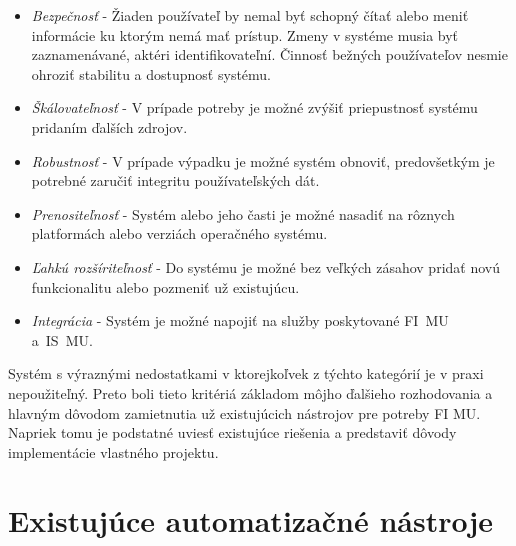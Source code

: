 \documentclass[
  digital, %
  twoside, %
  table,   %
  lof,     %
  lot,     %
]{fithesis3}
\begin{document}
\begin{itemize}
    \item \textit{Bezpečnosť} - Žiaden používateľ by nemal byť schopný čítať alebo meniť informácie ku ktorým nemá mať prístup. Zmeny v systéme musia byť zaznamenávané, aktéri identifikovateľní. Činnosť bežných používateľov nesmie ohroziť stabilitu a dostupnosť systému.
    \item \textit{Škálovateľnosť} - V prípade potreby je možné zvýšiť priepustnosť systému pridaním ďalších zdrojov.
    \item \textit{Robustnosť} - V prípade výpadku je možné systém obnoviť, predovšetkým je potrebné zaručiť integritu používateľských dát.  
    \item \textit{Prenositeľnosť} - Systém alebo jeho časti je možné nasadiť na rôznych platformách alebo verziách operačného systému.
    \item \textit{Ľahkú rozšíriteľnosť} - Do systému je možné bez veľkých zásahov pridať novú funkcionalitu alebo pozmeniť už existujúcu.
    \item \textit{Integrácia} - Systém je možné napojiť na služby poskytované FI~MU a~IS~MU.
\end{itemize}

Systém s výraznými nedostatkami v ktorejkoľvek z týchto kategórií je v praxi nepoužiteľný. Preto boli tieto kritériá základom môjho ďalšieho rozhodovania a hlavným dôvodom zamietnutia už existujúcich nástrojov pre potreby FI MU. Napriek tomu je podstatné uviesť existujúce riešenia a predstaviť dôvody implementácie vlastného projektu.

\section{Existujúce automatizačné nástroje}

\end{document}
